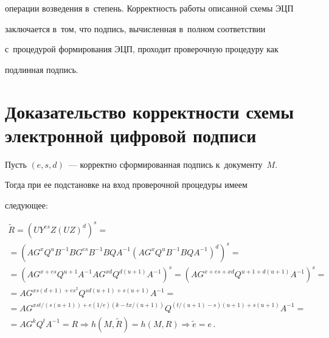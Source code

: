 операции возведения в~степень. Корректность работы описанной схемы ЭЦП 


заключается в~том, что подпись, вычисленная в~полном соответствии 


с~процедурой формирования ЭЦП, проходит проверочную процедуру как 


подлинная подпись.











\section{Доказательство корректности схемы электронной цифровой подписи}


 


   Пусть $(e,s,d)$~--- корректно сформированная подпись к~документу~$M$. 


Тогда при ее подстановке на вход проверочной процедуры имеем 


 сле\-ду\-ющее: 


 


    \vspace*{-2pt}


 


 \noindent


   \begin{multline*}


   \tilde{R}= \left( UY^{es} Z(UZ)^d\right)^s={}\\[-1pt]


   {}=\left( 


   AG^x Q^u B^{-1} BG^{es} B^{-1} B QA^{-1} \left( AG^x Q^u B^{-1} B Q A^{-


1}\right)^d\right)^s={}\\[-1pt]


   {}=


   \left( AG^{x+es} Q^{u+1} A^{-1} AG^{xd} Q^{d(u+1)} A^{-1}\right)^s =


   \left( AG^{x+es+xd} Q^{u+1+d(u+1)}A^{-1}\right)^s={}\\[-1pt]


   {}=AG^{xs(d+1)+es^2} Q^{sd(u+1)+s(u+1)} A^{-1}={}\\[-1pt]


   {}=AG^{ xst/(s(u+1))+e(1/e) (k-tx/(u+1))} Q^{(t/(u+1)-s)(u+1)+s(u+1) } A^{-1} 


={}\\[-1pt]


   {}= AG^k Q^t A^{-1} =R\Rightarrow


    h\left( M,\tilde{R}\right) =h(M,R) \Rightarrow \tilde{e}=e\,.


   \end{multline*}





